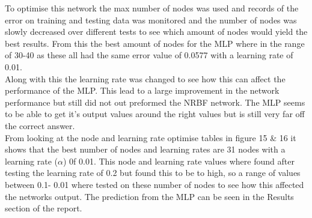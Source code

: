 \documentclass{IEEEtran}[11pt]
\begin{document}
\begin{flushleft}
  To optimise this network the max number of nodes was used and records of the
  error on training and testing data was monitored and the number of nodes was
  slowly decreased over different tests to see which amount of nodes would yield
  the best results. From this the best amount of nodes for the MLP where in the
  range of 30-40 as these all had the same error value of 0.0577 with a learning
  rate of 0.01.
  \\
  \vspace{1.5mm}
  Along with this the learning rate was changed to see how this can affect the
  performance of the MLP. This lead to a large improvement in the network
  performance but still did not out preformed the NRBF network. The MLP seems to
  be able to get it's output values around the right values but is still very
  far off the correct answer.
  \\
  \vspace{1.5mm}
  From looking at the node and learning rate optimise tables in figure 15 \& 16
  it shows that the best number of nodes and learning rates are 31 nodes with a
  learning rate ($\alpha$) 0f 0.01. This node and learning rate values where
  found after testing the learning rate of 0.2 but found this to be to high, so
  a range of values between 0.1- 0.01 where tested on these number of nodes
  to see how this affected the networks output. The prediction from the MLP can
  be seen in the Results section of the report.


\end{flushleft}
\end{document}
